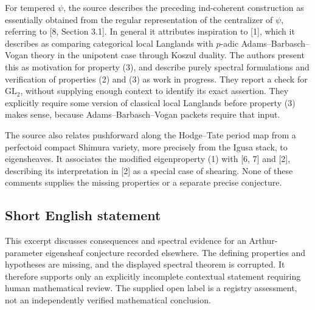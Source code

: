 \documentclass[11pt]{article}
\begin{document}
For tempered \(\psi\), the source describes the preceding ind-coherent construction as essentially obtained from the regular representation of the centralizer of \(\psi\), referring to [8, Section 3.1]. In general it attributes inspiration to [1], which it describes as comparing categorical local Langlands with \(p\)-adic Adams--Barbasch--Vogan theory in the unipotent case through Koszul duality. The authors present this as motivation for property (3), and describe purely spectral formulations and verification of properties (2) and (3) as work in progress. They report a check for \(\mathrm{GL}_2\), without supplying enough context to identify its exact assertion. They explicitly require some version of classical local Langlands before property (3) makes sense, because Adams--Barbasch--Vogan packets require that input.

The source also relates pushforward along the Hodge--Tate period map from a perfectoid compact Shimura variety, more precisely from the Igusa stack, to eigensheaves. It associates the modified eigenproperty (1) with [6, 7] and [2], describing its interpretation in [2] as a special case of shearing. None of these comments supplies the missing properties or a separate precise conjecture.
\subsection{Short English statement}
This excerpt discusses consequences and spectral evidence for an Arthur-parameter eigensheaf conjecture recorded elsewhere. The defining properties and hypotheses are missing, and the displayed spectral theorem is corrupted. It therefore supports only an explicitly incomplete contextual statement requiring human mathematical review. The supplied open label is a registry assessment, not an independently verified mathematical conclusion.
\end{document}
